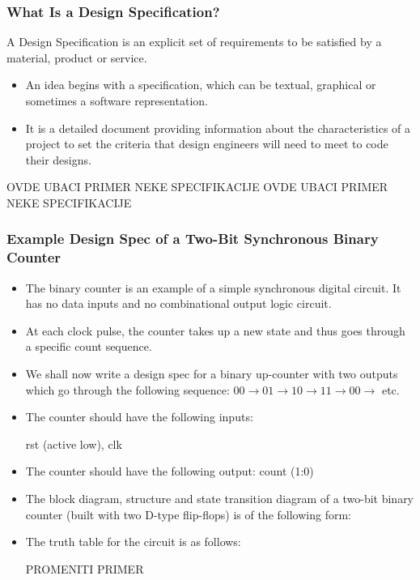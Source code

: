 \documentclass[t]{beamer}
\begin{document}
\begin{frame}
\frametitle{What Is a Design Specification?}
A Design Specification is an explicit
set of requirements to be satisfied by
a material, product or service.

\begin{itemize}
\item An idea begins with a specification, which can be textual, graphical or sometimes a software representation.

\item It is a detailed document providing information about the characteristics of a project to set the criteria that design
engineers will need to meet to code their designs.
\end{itemize}

OVDE UBACI PRIMER NEKE SPECIFIKACIJE
OVDE UBACI PRIMER NEKE SPECIFIKACIJE

\end{frame}



\begin{frame}
\frametitle{Example Design Spec of a Two-Bit Synchronous Binary Counter}

\begin{itemize}
\item The binary counter is an example of a simple
synchronous digital circuit. It has no data
inputs and no combinational output logic
circuit.
\item At each clock pulse, the counter takes up a
new state and thus goes through a specific
count sequence.

\item We shall now write a design spec for a binary
up-counter with two outputs which go through
the following sequence: $00 \rightarrow 01 \rightarrow 10 \rightarrow 11 \rightarrow 00 \rightarrow $ etc.

\item The counter should have the following inputs:

rst (active low),
clk

\item The counter should have the following output: count (1:0)

\item The block diagram, structure and state transition
diagram of a two-bit binary counter (built with two
D-type flip-flops) is of the following form:

\item The truth table for the circuit is as follows:

PROMENITI PRIMER
\end{itemize}


\end{frame}
\end{document}
